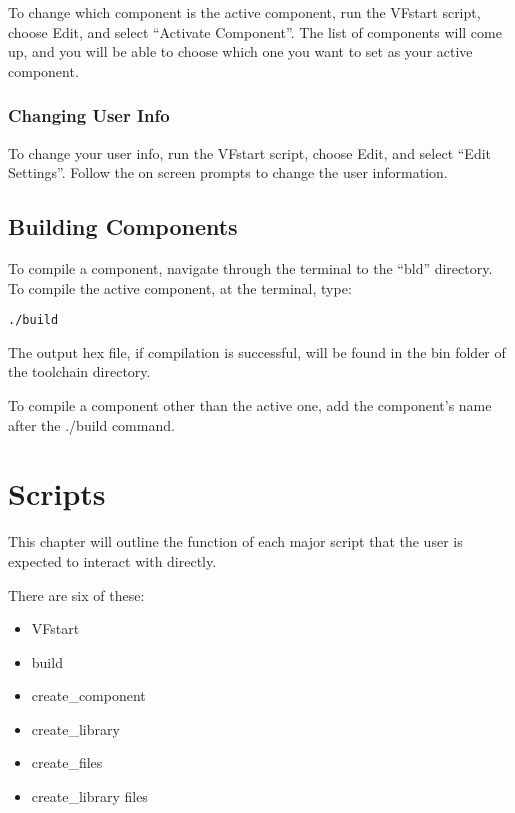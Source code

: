 \documentclass[a4paper, oneside, 11pt, titlepage, onecolumn, openright]{report}
\begin{document}
					To change which component is the active component, run the VFstart script, choose Edit, and select ``Activate Component''. The list of components will come up, and you will be able to choose which one you want to set as your active component.

				\subsection{Changing User Info}
					\label{Changing the Active component:Changing User Info} 
			
					To change your user info, run the VFstart script, choose Edit, and select ``Edit Settings''. Follow the on screen prompts to change the user information.

			\section{Building Components}
				\label{s:Getting Started:Building Components}

				To compile a component, navigate through the terminal to the ``bld'' directory. To compile the active component, at the terminal, type:

				\begin{lstlisting}
./build
				\end{lstlisting}

The output hex file, if compilation is successful, will be found in the bin folder of the toolchain directory.

To compile a component other than the active one, add the component's name after the ./build command. 
			
		\chapter{Scripts}
			\label{c:Scripts}
		
			This chapter will outline the function of each major script that the user is expected to interact with directly.
		
There are six of these:
			
			\begin{itemize}
		
				\item VFstart

				\item build

				\item create\_component

				\item create\_library

				\item create\_files

				\item create\_library files
		
			\end{itemize} 
	
\end{document}
